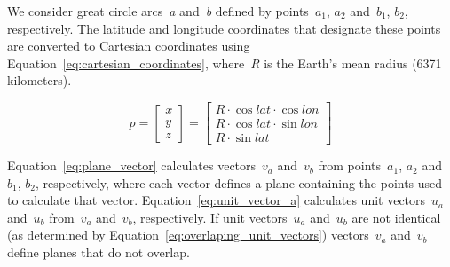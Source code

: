 We consider great circle arcs~\emph{a} and~\emph{b} defined by points~$a_1$, $a_2$ and~$b_1$, $b_2$, respectively. The latitude and longitude coordinates that designate these points are converted to Cartesian coordinates using Equation~\ref{eq:cartesian_coordinates}, where~\emph{R} is the Earth's mean radius (6371 kilometers).

\begin{figure}[ht]
	\begin{equation}
		\label{eq:cartesian_coordinates}
			p =
			\begin{bmatrix}
				x\\
				y\\
				z
			\end{bmatrix} =
			\begin{bmatrix}
				R \cdot \cos lat \cdot \cos lon\\
				R \cdot \cos lat \cdot \sin lon\\
				R \cdot \sin lat
			\end{bmatrix}
	\end{equation}
\end{figure}

Equation~\ref{eq:plane_vector} calculates vectors~$v_a$ and~$v_b$ from points~$a_1$, $a_2$ and~$b_1$, $b_2$, respectively, where each vector defines a plane containing the points used to calculate that vector. Equation~\ref{eq:unit_vector_a} calculates unit vectors~$u_a$ and~$u_b$ from~$v_a$ and~$v_b$, respectively. If unit vectors~$u_a$ and~$u_b$ are not identical (as determined by Equation~\ref{eq:overlaping_unit_vectors}) vectors~$v_a$ and~$v_b$ define planes that do not overlap.

\newcommand{\br}{\nonumber\\}
\newcommand{\pvlength}{\sqrt{{v_x}^2 + {v_y}^2 + {v_z}^2}}

